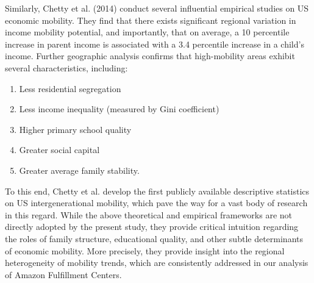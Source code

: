 \documentclass[11pt]{article}
\begin{document}
\begin{text}
\-\hspace{0.5cm} Similarly, Chetty et al. (2014) conduct several influential empirical studies on US economic mobility. They find that there exists significant regional variation in income mobility potential, and importantly, that on average, a 10 percentile increase in parent income is associated with a 3.4 percentile increase in a child’s income. Further geographic analysis confirms that high-mobility areas exhibit several characteristics, including:
\begin{enumerate}
    \item Less residential segregation
    \item Less income inequality (measured by Gini coefficient)
    \item Higher primary school quality
    \item Greater social capital
    \item Greater average family stability.
\end{enumerate} 
\-\hspace{0.5cm} To this end, Chetty et al. develop the first publicly available descriptive statistics on US intergenerational mobility, which pave the way for a vast body of research in this regard. While the above theoretical and empirical frameworks are not directly adopted by the present study, they provide critical intuition regarding the roles of family structure, educational quality, and other subtle determinants of economic mobility. More precisely, they provide insight into the regional heterogeneity of mobility trends, which are consistently addressed in our analysis of Amazon Fulfillment Centers. 


\end{text}
\end{document}

